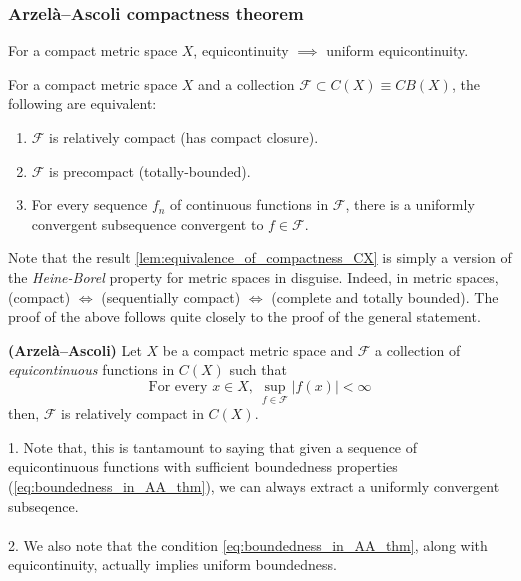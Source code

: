 \subsubsection{Arzelà--Ascoli compactness theorem}

\begin{lemma}
    For a compact metric space $X$, equicontinuity $\implies$ uniform equicontinuity. 
\end{lemma}
\begin{lemma}\label{lem:equivalence_of_compactness_CX}
    For a compact metric space $X$ and a collection $\mathcal F \subset C(X)\equiv CB(X)$, the following are equivalent:
    \begin{enumerate}
        \item $\mathcal F$ is relatively compact (has compact closure).
        \item $\mathcal F$ is precompact (totally-bounded).
        \item For every sequence $f_n$ of continuous functions in $\mathcal F$, there is a uniformly convergent subsequence convergent to $f\in \mathcal F$.
    \end{enumerate}

\end{lemma}
\begin{remark}
    Note that the result \ref{lem:equivalence_of_compactness_CX} is simply a version of the \emph{Heine-Borel} property for metric spaces in disguise. Indeed, in metric spaces, (compact) $\iff$ (sequentially compact) $\iff$ (complete and totally bounded). The proof of the above follows quite closely to the proof of the general statement. 
\end{remark}

\begin{theorem}\label{thm:AA}
\textbf{(Arzelà--Ascoli)}
{Let $X$ be a compact metric space and $\mathcal F$ a collection of \emph{equicontinuous} functions in $C(X)$ such that \begin{equation}\label{eq:boundedness_in_AA_thm}
    \text{For every }x\in X, \ \sup_{f\in \mathcal F}|f(x)|<\infty
\end{equation}
then, $\mathcal F$ is relatively compact in $C(X)$.}
    
\end{theorem}
\begin{remark}
1. Note that, this is tantamount to saying that given a sequence of equicontinuous functions with sufficient boundedness properties (\ref{eq:boundedness_in_AA_thm}), we can always extract a uniformly convergent subseqence. 
\\\\2. We also note that the condition \ref{eq:boundedness_in_AA_thm}, along with equicontinuity, actually implies uniform boundedness. 
\end{remark}


